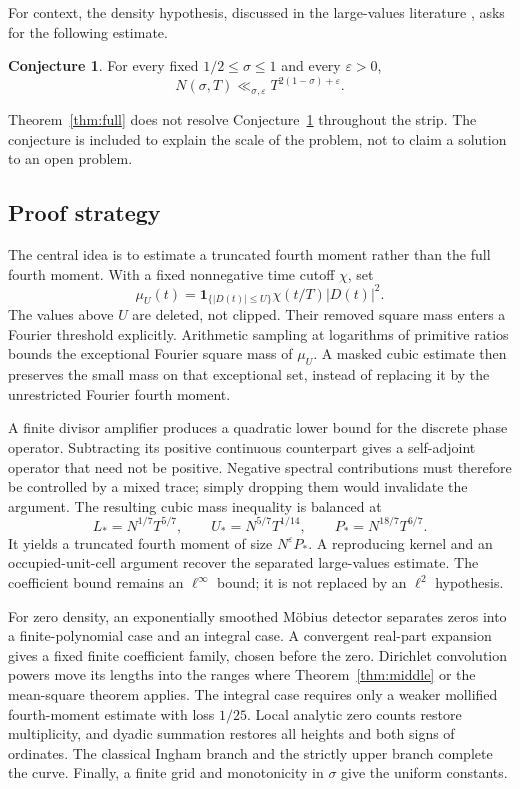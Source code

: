 \documentclass[11pt,a4paper,oneside]{article}
\theoremstyle{definition}
\newcommand{\eps}{\varepsilon}
\newcommand{\one}{\mathbf 1}
\newtheorem{conjecture}[theorem]{Conjecture}
\numberwithin{equation}{section}
\begin{document}
For context, the density hypothesis, discussed in the large-values literature \cite{Montgomery,GuthMaynard,Kerr}, asks for the following estimate.
\begin{conjecture}\label{conj:density}
For every fixed $1/2\le\sigma\le1$ and every $\eps>0$,
\[
 N(\sigma,T)\ll_{\sigma,\eps}T^{2(1-\sigma)+\eps}.
\]
\end{conjecture}
Theorem~\ref{thm:full} does not resolve Conjecture~\ref{conj:density} throughout the strip. The conjecture is included to explain the scale of the problem, not to claim a solution to an open problem.

\subsection{Proof strategy}
The central idea is to estimate a truncated fourth moment rather than the full fourth moment. With a fixed nonnegative time cutoff $\chi$, set
\[
 \mu_U(t)=\one_{\{|D(t)|\le U\}}\chi(t/T)|D(t)|^2.
\]
The values above $U$ are deleted, not clipped. Their removed square mass enters a Fourier threshold explicitly. Arithmetic sampling at logarithms of primitive ratios bounds the exceptional Fourier square mass of $\mu_U$. A masked cubic estimate then preserves the small mass on that exceptional set, instead of replacing it by the unrestricted Fourier fourth moment.

A finite divisor amplifier produces a quadratic lower bound for the discrete phase operator. Subtracting its positive continuous counterpart gives a self-adjoint operator that need not be positive. Negative spectral contributions must therefore be controlled by a mixed trace; simply dropping them would invalidate the argument. The resulting cubic mass inequality is balanced at
\[
 L_*=N^{1/7}T^{5/7},\qquad U_*=N^{5/7}T^{1/14},\qquad
 P_*=N^{18/7}T^{6/7}.
\]
It yields a truncated fourth moment of size $N^\eps P_*$. A reproducing kernel and an occupied-unit-cell argument recover the separated large-values estimate. The coefficient bound remains an $\ell^\infty$ bound; it is not replaced by an $\ell^2$ hypothesis.

For zero density, an exponentially smoothed M\"obius detector separates zeros into a finite-polynomial case and an integral case. A convergent real-part expansion gives a fixed finite coefficient family, chosen before the zero. Dirichlet convolution powers move its lengths into the ranges where Theorem~\ref{thm:middle} or the mean-square theorem applies. The integral case requires only a weaker mollified fourth-moment estimate with loss $1/25$. Local analytic zero counts restore multiplicity, and dyadic summation restores all heights and both signs of ordinates. The classical Ingham branch and the strictly upper branch complete the curve. Finally, a finite grid and monotonicity in $\sigma$ give the uniform constants.
\end{document}
